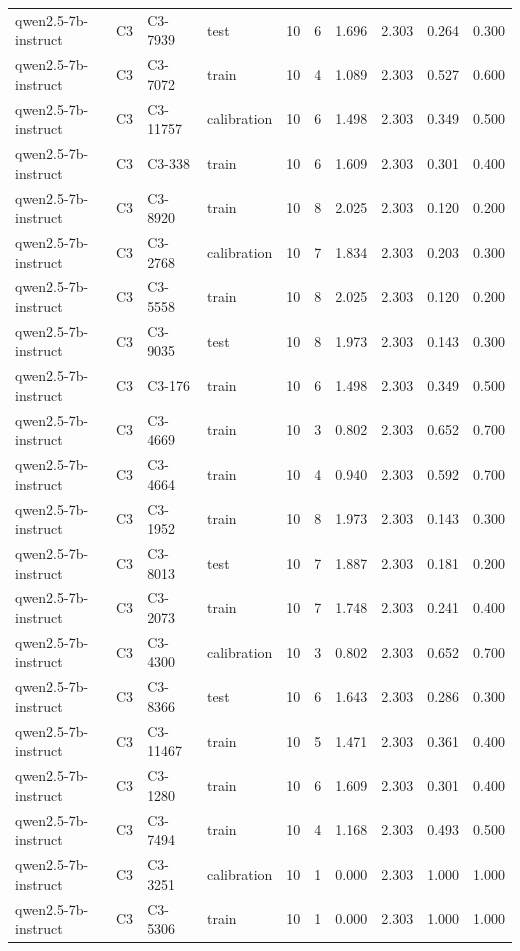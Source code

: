 \begin{table}
\begin{tabular}{llllrrrrrr}
qwen2.5-7b-instruct & C3 & C3-7939 & test & 10 & 6 & 1.696 & 2.303 & 0.264 & 0.300 \\
qwen2.5-7b-instruct & C3 & C3-7072 & train & 10 & 4 & 1.089 & 2.303 & 0.527 & 0.600 \\
qwen2.5-7b-instruct & C3 & C3-11757 & calibration & 10 & 6 & 1.498 & 2.303 & 0.349 & 0.500 \\
qwen2.5-7b-instruct & C3 & C3-338 & train & 10 & 6 & 1.609 & 2.303 & 0.301 & 0.400 \\
qwen2.5-7b-instruct & C3 & C3-8920 & train & 10 & 8 & 2.025 & 2.303 & 0.120 & 0.200 \\
qwen2.5-7b-instruct & C3 & C3-2768 & calibration & 10 & 7 & 1.834 & 2.303 & 0.203 & 0.300 \\
qwen2.5-7b-instruct & C3 & C3-5558 & train & 10 & 8 & 2.025 & 2.303 & 0.120 & 0.200 \\
qwen2.5-7b-instruct & C3 & C3-9035 & test & 10 & 8 & 1.973 & 2.303 & 0.143 & 0.300 \\
qwen2.5-7b-instruct & C3 & C3-176 & train & 10 & 6 & 1.498 & 2.303 & 0.349 & 0.500 \\
qwen2.5-7b-instruct & C3 & C3-4669 & train & 10 & 3 & 0.802 & 2.303 & 0.652 & 0.700 \\
qwen2.5-7b-instruct & C3 & C3-4664 & train & 10 & 4 & 0.940 & 2.303 & 0.592 & 0.700 \\
qwen2.5-7b-instruct & C3 & C3-1952 & train & 10 & 8 & 1.973 & 2.303 & 0.143 & 0.300 \\
qwen2.5-7b-instruct & C3 & C3-8013 & test & 10 & 7 & 1.887 & 2.303 & 0.181 & 0.200 \\
qwen2.5-7b-instruct & C3 & C3-2073 & train & 10 & 7 & 1.748 & 2.303 & 0.241 & 0.400 \\
qwen2.5-7b-instruct & C3 & C3-4300 & calibration & 10 & 3 & 0.802 & 2.303 & 0.652 & 0.700 \\
qwen2.5-7b-instruct & C3 & C3-8366 & test & 10 & 6 & 1.643 & 2.303 & 0.286 & 0.300 \\
qwen2.5-7b-instruct & C3 & C3-11467 & train & 10 & 5 & 1.471 & 2.303 & 0.361 & 0.400 \\
qwen2.5-7b-instruct & C3 & C3-1280 & train & 10 & 6 & 1.609 & 2.303 & 0.301 & 0.400 \\
qwen2.5-7b-instruct & C3 & C3-7494 & train & 10 & 4 & 1.168 & 2.303 & 0.493 & 0.500 \\
qwen2.5-7b-instruct & C3 & C3-3251 & calibration & 10 & 1 & 0.000 & 2.303 & 1.000 & 1.000 \\
qwen2.5-7b-instruct & C3 & C3-5306 & train & 10 & 1 & 0.000 & 2.303 & 1.000 & 1.000 \\

\end{tabular}
\end{table}
